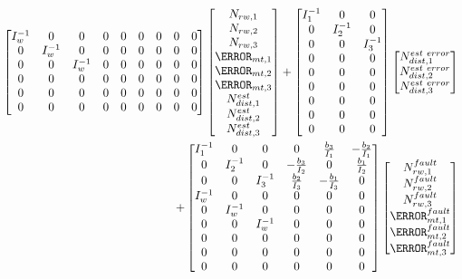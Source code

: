 \begin{align}
\begin{bmatrix}
I_w^{-1} & 0 & 0 & 0 & 0 & 0 & 0 & 0 & 0 \\
0 & I_w^{-1} & 0 & 0 & 0 & 0 & 0 & 0 & 0 \\ 
0 & 0 & I_w^{-1} & 0 & 0 & 0 & 0 & 0 & 0\\  
0 & 0 & 0 & 0 & 0 & 0 & 0 & 0 & 0\\
0 & 0 & 0 & 0 & 0 & 0 & 0 & 0 & 0\\
0 & 0 & 0 & 0 & 0 & 0 & 0 & 0 & 0\\
\end{bmatrix}
\begin{bmatrix}
N_{rw,1} \\
N_{rw,2} \\
N_{rw,3}\\
\m_{mt,1} \\
\m_{mt,2} \\
\m_{mt,3} \\
N^{est}_{dist,1} \\
N^{est}_{dist,2} \\
N^{est}_{dist,3}
\end{bmatrix}
+
\begin{bmatrix}
I_1^{-1} & 0 & 0 \\
0 & I_2^{-1} & 0 \\
0 & 0 & I_3^{-1}\\
0 & 0 & 0 \\
0 & 0 & 0 \\
0 & 0 & 0 \\
0 & 0 & 0 \\
0 & 0 & 0 \\
0 & 0 & 0 
\end{bmatrix}
\begin{bmatrix}
N^{est \ error}_{dist,1} \\
N^{est \ error}_{dist,2} \\
N^{est \ error}_{dist,3}\\
\end{bmatrix}
\\
+ 
\begin{bmatrix}
I_1^{-1} & 0 & 0 & 0 & \frac{b_3}{I_1} & -\frac{b_2}{I_1}\\
0 & I_2^{-1} & 0 & - \frac{b_3}{I_2} & 0 &  \frac{b_1}{I_2} \\ 
0 & 0 & I_3^{-1} &  \frac{b_2}{I_3} &  -\frac{b_1}{I_3} & 0 \\  
I_w^{-1} & 0 & 0 & 0 & 0 & 0 \\
0 & I_w^{-1} & 0 & 0 & 0 & 0 \\ 
0 & 0 & I_w^{-1} & 0 & 0 & 0 \\  
0 & 0 & 0 & 0 & 0 & 0 \\
0 & 0 & 0 & 0 & 0 & 0 \\
0 & 0 & 0 & 0 & 0 & 0 \\
\end{bmatrix}
\begin{bmatrix}
N^{fault}_{rw,1} \\
N^{fault}_{rw,2} \\
N^{fault}_{rw,3}\\
\m^{fault}_{mt,1} \\
\m^{fault}_{mt,2} \\
\m^{fault}_{mt,3} 
\end{bmatrix}
\label{eq:uioMatrices}
\end{align}
